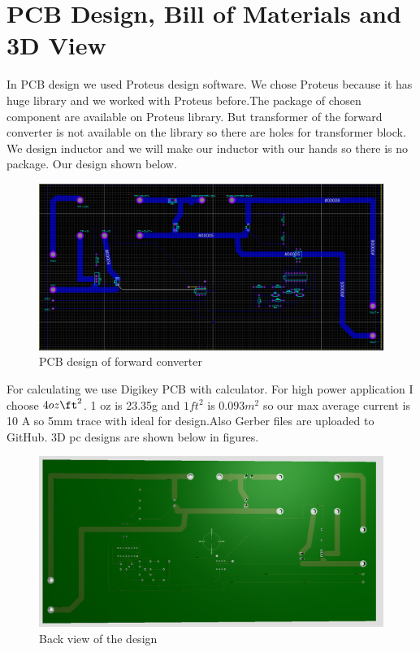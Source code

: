 \documentclass{article}
\begin{document}
\section*{PCB Design, Bill of Materials and 3D View}
In PCB design we used Proteus design software. We chose Proteus because it has huge library and we worked with Proteus before.The package of chosen component are available on Proteus library. But transformer of the forward converter is not available on the library so there are holes for transformer block. We design inductor  and we will make our inductor with our hands so there is no package. Our design shown below. 
\begin{figure}[H]
    \centering
    \includegraphics[scale=0.4]{pcby.PNG}
    \caption{PCB design of forward converter}
    \label{fig:my_label}
\end{figure}
For calculating we use Digikey PCB with calculator. For high power application I choose $4oz\ft^2$. 1 oz is 23.35g and $1ft^2$ is $0.093m^2$ so our max average current is 10 A so 5mm trace with ideal for design.Also Gerber files are uploaded to GitHub. 3D pc designs are shown below in figures. 
\begin{figure}[H]
    \centering
    \includegraphics[scale=0.3]{arkapng.PNG}
    \caption{Back view of the design}
    \label{fig:my_label}
\end{figure}
\end{document}
